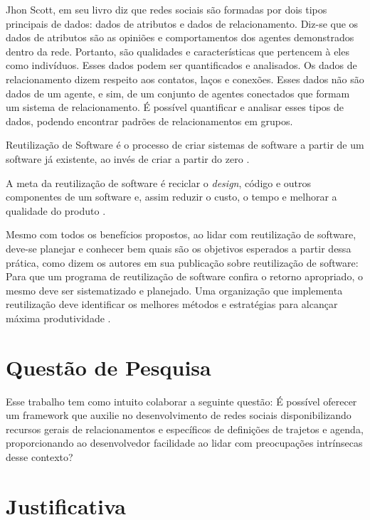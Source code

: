 Jhon Scott, em seu livro \cite{Scott:Carrington:2011} diz que redes sociais são formadas por dois tipos principais de dados: dados de atributos e dados de relacionamento. Diz-se que os dados de atributos são as opiniões e comportamentos dos agentes demonstrados dentro da rede. Portanto, são qualidades e características que pertencem à eles como indivíduos. Esses dados podem ser quantificados e analisados. Os dados de relacionamento dizem respeito aos contatos, laços e conexões. Esses dados não são dados de um agente, e sim, de um conjunto de agentes conectados que formam um sistema de relacionamento. É possível quantificar e analisar esses tipos de dados, podendo encontrar padrões de relacionamentos em grupos.

Reutilização de Software é o processo de criar sistemas de software a partir de um software já existente, ao invés de criar a partir do zero \cite{Krueger:1992}.

A meta da reutilização de software é reciclar o \textit{design}, código e outros componentes de um software e, assim reduzir o custo, o tempo e melhorar a qualidade do produto \cite{Keswani:Joshi:Jatain:2014}.

Mesmo com todos os benefícios propostos, ao lidar com reutilização de software, deve-se planejar e conhecer bem quais são os objetivos esperados a partir dessa prática, como dizem os autores em sua publicação sobre reutilização de software: Para que um programa de reutilização de software confira o retorno apropriado, o mesmo deve ser sistematizado e planejado. Uma organização que implementa reutilização deve identificar os melhores métodos e estratégias para alcançar máxima produtividade \cite{Keswani:Joshi:Jatain:2014}.

\section*{Questão de Pesquisa}

Esse trabalho tem como intuito colaborar a seguinte questão: É possível oferecer um framework que auxilie no desenvolvimento de redes sociais disponibilizando recursos gerais de relacionamentos e específicos de definições de trajetos e agenda, proporcionando ao desenvolvedor facilidade ao lidar com preocupações intrínsecas desse contexto?

\section*{Justificativa}

